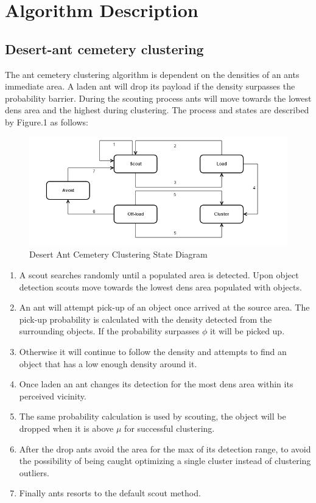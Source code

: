 \documentclass[12pt]{article}
\begin{document}
\section{Algorithm Description}

\subsection{Desert-ant cemetery clustering}

\par{The ant cemetery clustering algorithm is dependent on the densities of an ants immediate area. A laden ant will  drop its payload if the density surpasses the probability barrier. During the scouting process ants will move towards the lowest dens area and the highest during clustering. The process and states are described by Figure.1 as follows:}
\\
\begin{figure}[h]
\includegraphics[width=\textwidth]{desertant.png}
\centering
\caption{Desert Ant Cemetery Clustering State Diagram}
\label{fig:desertamtState}
\end{figure}

\begin{enumerate}[nolistsep]
\item A scout searches randomly until a populated area is detected. Upon object detection scouts move towards the lowest dens area populated with objects.
\item An ant will attempt pick-up of an object once arrived at the source area. The pick-up probability is calculated with the density detected from the surrounding objects. If the probability surpasses $\phi$ it will be picked up.
\item Otherwise it will continue to follow the density and attempts to find an object that has a low enough density around it.
\item Once laden an ant changes its detection for the most dens area within its perceived vicinity.
\item The same probability calculation is used by scouting, the object will be dropped when it is above $\mu$ for successful clustering.
\item After the drop ants avoid the area for the max of its detection range, to avoid the possibility of being caught optimizing a single cluster instead of clustering outliers.
\item Finally ants resorts to the default scout method.
\end{enumerate}
\end{document}
